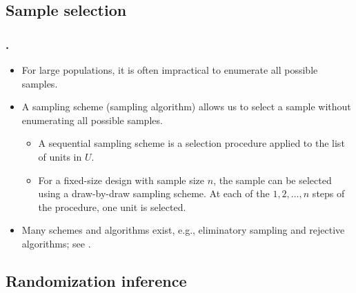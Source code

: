 \documentclass{my_eth_beamer}
\numberwithin{equation}{section}
\begin{document}
\subsection{Sample selection}\label{sec:basics_drawsample}

\begin{frame}
    \frametitle{\insertsectionnumber.\insertsubsectionnumber~\insertsubsection}
    \begin{itemize}
    \setlength{\itemsep}{8pt}
        \item For large populations, it is often impractical to enumerate all
            possible samples.
        \item A \alert{sampling scheme} (sampling algorithm) allows us to
            select a sample without enumerating all possible samples.
            \vspace{0.25em}
            \begin{itemize}
            \setlength{\itemsep}{4pt}
                \item A \alert{sequential} sampling scheme is a selection
                    procedure applied to the list of units in $U$.
                \item For a fixed-size design with sample size $n$, the sample
                    can be selected using a \alert{draw-by-draw sampling
                    scheme}. At each of the $1,2,\ldots,n$ steps of the
                    procedure, one unit is selected.
            \end{itemize}
       \item Many schemes and algorithms exist, e.g., eliminatory sampling
           and rejective algorithms; see \citet[][Chapter 3]{tille_2006}.
    \end{itemize}
\end{frame}

\setcounter{Bsp}{\the\numexpr\value{Bsp}+1\relax}

\subsection{Randomization inference}\label{sec:basics_randomization}
\end{document}

